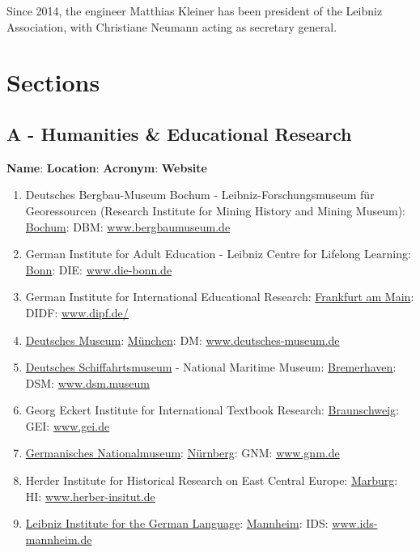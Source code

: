 \documentclass{book}
\numberwithin{equation}{section}
\begin{document}
Since 2014, the engineer Matthias Kleiner has been president of the Leibniz Association, with Christiane Neumann acting as secretary general. 

\section{Sections}

\subsection{A - Humanities \& Educational Research}
\textbf{Name}: \textbf{Location}: \textbf{Acronym}: \textbf{Website}
\begin{enumerate}
    \item Deutsches Bergbau-Museum Bochum - Leibniz-Forschungsmuseum für Georessourcen (Research Institute for Mining History and Mining Museum): \href{https://en.wikipedia.org/wiki/Bochum}{Bochum}: DBM: \url{www.bergbaumuseum.de}
    \item German Institute for Adult Education - Leibniz Centre for Lifelong Learning: \href{https://en.wikipedia.org/wiki/Bonn}{Bonn}: DIE: \url{www.die-bonn.de}
    \item German Institute for International Educational Research: \href{https://en.wikipedia.org/wiki/Frankfurt_am_Main}{Frankfurt am Main}: DIDF: \url{www.dipf.de/}
    \item \href{https://en.wikipedia.org/wiki/Deutsches_Museum}{Deutsches Museum}: \href{https://en.wikipedia.org/wiki/M%C3%BCnchen}{München}: DM: \url{www.deutsches-museum.de}
    \item \href{https://en.wikipedia.org/wiki/Deutsches_Schiffahrtsmuseum}{Deutsches Schiffahrtsmuseum} - National Maritime Museum: \href{https://en.wikipedia.org/wiki/Bremerhaven}{Bremerhaven}: DSM: \url{www.dsm.museum}
    \item Georg Eckert Institute for International Textbook Research: \href{https://en.wikipedia.org/wiki/Braunschweig}{Braunschweig}: GEI: \url{www.gei.de}
    \item \href{https://en.wikipedia.org/wiki/Germanisches_Nationalmuseum}{Germanisches Nationalmuseum}: \href{https://en.wikipedia.org/wiki/N%C3%BCrnberg}{Nürnberg}: GNM: \url{www.gnm.de}
    \item Herder Institute for Historical Research on East Central Europe: \href{https://en.wikipedia.org/wiki/Marburg}{Marburg}: HI: \url{www.herber-insitut.de}
    \item \href{https://en.wikipedia.org/wiki/Leibniz_Institute_for_the_German_Language}{Leibniz Institute for the German Language}: \href{https://en.wikipedia.org/wiki/Mannheim}{Mannheim}: IDS: \url{www.ids-mannheim.de}

\end{enumerate}
\end{document}
